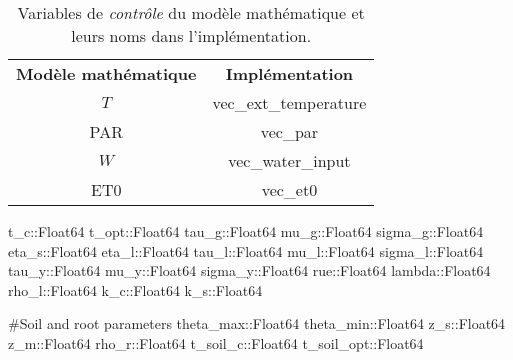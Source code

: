 \begin{table}[htb!]
  \centering
  \begin{tabular}{c|c}
    \toprule
    \textbf{Modèle mathématique} & \textbf{Implémentation} \\
    $T$ & vec_ext_temperature \\
    PAR & vec_par \\
    $W$ & vec_water_input \\
    ET0 & vec_et0 \\
    \bottomrule
  \end{tabular}
  \caption{Variables de \emph{contrôle} du modèle mathématique et leurs noms
  dans l'implémentation.}
  \label{table:control_var}
\end{table}

    
    t_c::Float64
    t_opt::Float64
    tau_g::Float64
    mu_g::Float64
    sigma_g::Float64
    eta_s::Float64
    eta_l::Float64
    tau_l::Float64
    mu_l::Float64
    sigma_l::Float64
    tau_y::Float64
    mu_y::Float64
    sigma_y::Float64
    rue::Float64
    lambda::Float64
    rho_l::Float64
    k_c::Float64
    k_s::Float64

    #Soil and root parameters
    theta_max::Float64
    theta_min::Float64
    z_s::Float64
    z_m::Float64
    rho_r::Float64
    t_soil_c::Float64
    t_soil_opt::Float64
